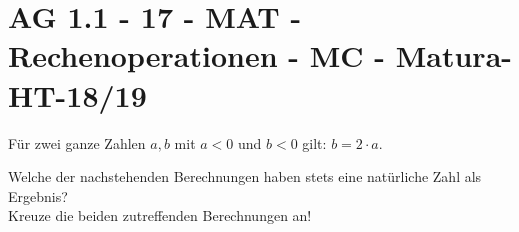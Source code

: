 \section{AG 1.1 - 17 - MAT - Rechenoperationen - MC - Matura-HT-18/19}

\begin{beispiel}[AG 1.1]{1}
Für zwei ganze Zahlen $a,b$ mit $a<0$ und $b<0$ gilt: $b=2\cdot a$.

Welche der nachstehenden Berechnungen haben stets eine natürliche Zahl als Ergebnis?\\
Kreuze die beiden zutreffenden Berechnungen an!

\end{beispiel}